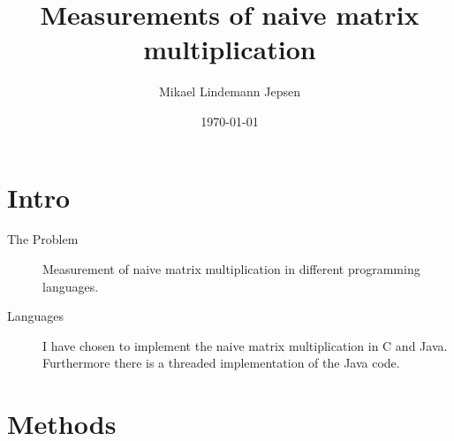 \documentclass{article}
\author{Mikael Lindemann Jepsen}
\date{\today}
\title{Measurements of naive matrix multiplication}
\begin{document}
	\maketitle
	\section{Intro}
	\begin{description}
		\item [The Problem] Measurement of naive matrix multiplication in different programming languages.
		\item [Languages] I have chosen to implement the naive matrix multiplication in C and Java. Furthermore there is a threaded implementation of the Java code.
	\end{description}

	\section{Methods}
\end{document}

